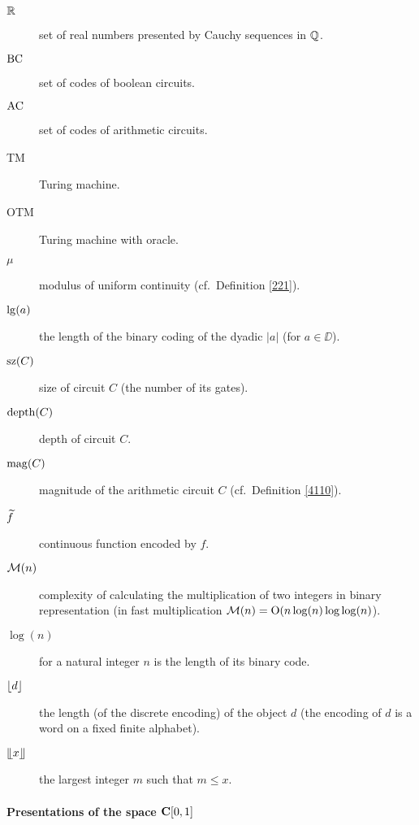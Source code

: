 \begin{description}
\item [$\mathbb {R}$] 
set of real numbers presented by Cauchy sequences in $\mathbb {Q}$.

\item [${\rm BC}$] 
set of codes of boolean circuits.

\item [${\rm AC}$] 
set of codes of arithmetic circuits.

\item [{\rm TM}] 
Turing machine.

\item [{\rm OTM}] 
Turing machine with oracle.

\item [$\mu$] 
modulus of uniform continuity (cf.\ Definition \ref{221}).

\item [${\rm lg}(a)$] 
the length of the binary coding of the dyadic $\vert a \vert$ (for $a \in \DD$).

\item [${\rm sz}(C)$] 
size of circuit $C$ (the number of its gates).

\item [${\rm depth}(C)$] 
depth of circuit $C$.

\item [${\rm mag}(C)$] 
magnitude of the arithmetic circuit $C$ (cf.\ Definition \ref{4110}).

\item [$\widetilde{f}$] 
continuous function encoded by $f$.

\item [${{\cal M}}(n)$] 
complexity of calculating the multiplication of two integers in binary representation (in fast multiplication ${{\cal M}}(n) = {\rm O}(n \log(n) \log\log(n)$).

\item[$\log(n)$] for a natural integer $n$ is the length of its binary code.

\item [$\lfloor d \rfloor$]	
the length (of the discrete encoding) of the object $d$ (the encoding of $d$ is a word on a fixed finite alphabet).

\item[$\llfloor x \rrfloor$] 
the largest integer $m$ such that $m\leq x$.  
 
\end{description}

\paragraph{Presentations of the space ${{\bf C}[0,1]}$}~

